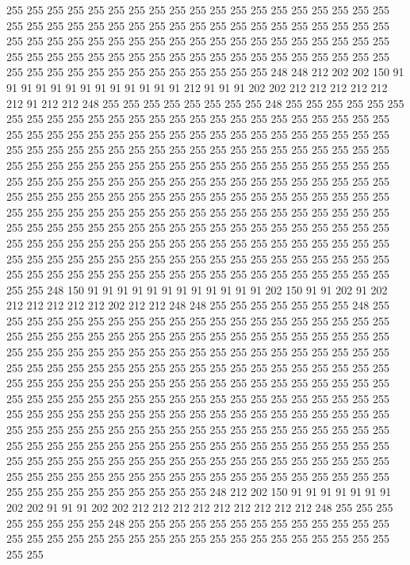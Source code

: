 255 255 255 255 255 255 255 255 255 255 255 255 255 255 255 255 255 255 255 255
255 255 255 255 255 255 255 255 255 255 255 255 255 255 255 255 255 255 255 255
255 255 255 255 255 255 255 255 255 255 255 255 255 255 255 255 255 255 255 255
255 255 255 255 255 255 255 255 255 255 255 255 255 255 255 255 255 255 255 255
255 255 255 255 255 255 255 255 255 248 248 212 202 202 150 91 91 91 91 91
91 91 91 91 91 91 91 91 212 91 91 91 202 202 212 212 212 212 212 212
91 212 212 248 255 255 255 255 255 255 255 255 248 255 255 255 255 255 255 255
255 255 255 255 255 255 255 255 255 255 255 255 255 255 255 255 255 255 255 255
255 255 255 255 255 255 255 255 255 255 255 255 255 255 255 255 255 255 255 255
255 255 255 255 255 255 255 255 255 255 255 255 255 255 255 255 255 255 255 255
255 255 255 255 255 255 255 255 255 255 255 255 255 255 255 255 255 255 255 255
255 255 255 255 255 255 255 255 255 255 255 255 255 255 255 255 255 255 255 255
255 255 255 255 255 255 255 255 255 255 255 255 255 255 255 255 255 255 255 255
255 255 255 255 255 255 255 255 255 255 255 255 255 255 255 255 255 255 255 255
255 255 255 255 255 255 255 255 255 255 255 255 255 255 255 255 255 255 255 255
255 255 255 255 255 255 255 255 255 255 255 255 255 255 255 255 255 255 255 255
255 255 255 255 255 255 255 255 255 255 255 255 255 255 255 255 255 255 255 255
255 255 255 255 255 255 255 255 255 255 248 150 91 91 91 91 91 91 91 91
91 91 91 91 202 150 91 91 202 91 202 212 212 212 212 212 202 212 212 248
248 255 255 255 255 255 255 255 248 255 255 255 255 255 255 255 255 255 255 255
255 255 255 255 255 255 255 255 255 255 255 255 255 255 255 255 255 255 255 255
255 255 255 255 255 255 255 255 255 255 255 255 255 255 255 255 255 255 255 255
255 255 255 255 255 255 255 255 255 255 255 255 255 255 255 255 255 255 255 255
255 255 255 255 255 255 255 255 255 255 255 255 255 255 255 255 255 255 255 255
255 255 255 255 255 255 255 255 255 255 255 255 255 255 255 255 255 255 255 255
255 255 255 255 255 255 255 255 255 255 255 255 255 255 255 255 255 255 255 255
255 255 255 255 255 255 255 255 255 255 255 255 255 255 255 255 255 255 255 255
255 255 255 255 255 255 255 255 255 255 255 255 255 255 255 255 255 255 255 255
255 255 255 255 255 255 255 255 255 255 255 255 255 255 255 255 255 255 255 255
255 255 255 255 255 255 255 255 255 255 255 255 255 255 255 255 255 255 255 255
255 255 255 255 255 255 255 255 255 248 212 202 150 91 91 91 91 91 91 91
202 202 91 91 91 202 202 212 212 212 212 212 212 212 212 212 248 255 255 255
255 255 255 255 255 248 255 255 255 255 255 255 255 255 255 255 255 255 255 255
255 255 255 255 255 255 255 255 255 255 255 255 255 255 255 255 255 255 255 255
